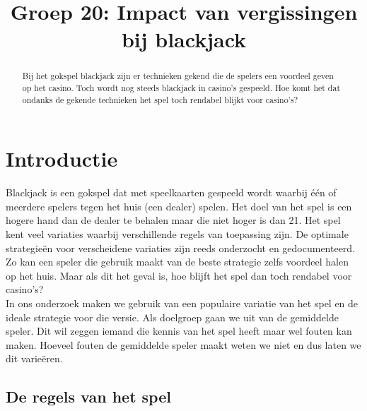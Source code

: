 \documentclass[conference]{IEEEtran}
\begin{document}
\title{Groep 20: Impact van vergissingen bij blackjack}

\author{
\and
{}
\and
{}
}

\maketitle


\begin{abstract}
Bij het gokspel blackjack zijn er technieken gekend die de spelers een voordeel geven op het casino. Toch wordt nog steeds blackjack in casino's gespeeld. Hoe komt het dat ondanks de gekende technieken het spel toch rendabel blijkt voor casino's?
\end{abstract}

\IEEEpeerreviewmaketitle

\section{Introductie}
Blackjack is een gokspel dat met speelkaarten gespeeld wordt waarbij \'e\'en of meerdere spelers tegen het huis (een dealer) spelen. Het doel van het spel is een hogere hand dan de dealer te behalen maar die niet hoger is dan 21. Het spel kent veel variaties waarbij verschillende regels van toepassing zijn. De optimale strategie\"en voor verscheidene variaties zijn reeds onderzocht en gedocumenteerd. Zo kan een speler die gebruik maakt van de beste strategie zelfs voordeel halen op het huis. Maar als dit het geval is, hoe blijft het spel dan toch rendabel voor casino's?
\\In ons onderzoek maken we gebruik van een populaire variatie van het spel en de ideale strategie voor die versie. Als doelgroep gaan we uit van de gemiddelde speler. Dit wil zeggen iemand die kennis van het spel heeft maar wel fouten kan maken. Hoeveel fouten de gemiddelde speler maakt weten we niet en dus laten we dit varie\"eren.

\subsection{De regels van het spel}
\end{document}
